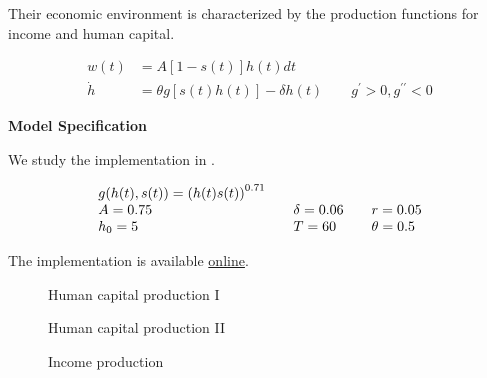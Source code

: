 \begin{frame}
Their economic environment is characterized by the production functions for income and human capital.

\begin{align*}
w(t)    & = A[1 - s(t)]h(t)dt \\
\dot{h} & = \theta g[s(t) h(t)] - \delta h(t) \qquad g^\prime > 0, g^{\prime\prime} < 0
\end{align*}

\end{frame}
\begin{frame}\textbf{Model Specification}\vspace{0.3cm}

We study the implementation in .

\begin{align*}\begin{array}{l@{\qquad}l@{\qquad}l}
	g(h(t), s(t)) = \left(h(t) s(t)\right)^{0.71} & & \\
	A = 0.75 & \delta = 0.06 & r = 0.05\\
	h_0 = 5 & T = 60 & \theta = 0.5
\end{array}\end{align*}

The implementation is available \href{http://bit.ly/2I2bMpb}{online}.
\end{frame}


\begin{frame}\begin{figure}[htp]\centering
\caption{Human capital production I}\label{Human capital production I}
\end{figure}\end{frame}

\begin{frame}\begin{figure}[htp]\centering
\caption{Human capital production II}\label{Human capital production II}
\end{figure}\end{frame}

\begin{frame}\begin{figure}[htp]\centering
\caption{Income production}\label{Income production}
\end{figure}\end{frame}

